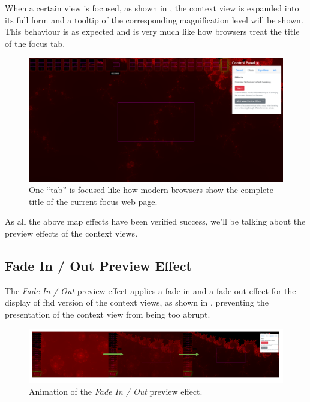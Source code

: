 When a certain view is focused, as shown in , the context view is expanded into its full form and a tooltip of the corresponding magnification level will be shown. This behaviour is as expected and is very much like how browsers treat the title of the focus tab.

\begin{figure}[H]
\centering
\includegraphics[width=\textwidth,keepaspectratio]{Figures/Chapter5/tabs2.png}
\decoRule
\caption[Tabs Effect with One Focused Context View]{One ``tab'' is focused like how modern browsers show the complete title of the current focus web page.}
\label{fig:chap5:tabs2}
\end{figure}

As all the above \gls{map} effects have been verified success, we'll be talking about the preview effects of the context views.

\subsection{Fade In / Out Preview Effect}
\label{chap5:fade}

The \emph{Fade In / Out} preview effect applies a fade-in and a fade-out effect for the display of \gls{fhd} version of the context views, as shown in , preventing the presentation of the context view from being too abrupt.

\begin{figure}[H]
\centering
\includegraphics[width=\textwidth,keepaspectratio]{Figures/Chapter5/fadepreview.png}
\decoRule
\caption[Fade In / Out Preview Effect]{Animation of the \emph{Fade In / Out} preview effect.}
\label{fig:chap5:fadepreview}
\end{figure}

